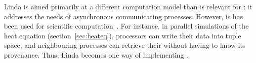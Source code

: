 Linda is aimed primarily at a different computation model than is
relevant for : it addresses the needs of
asynchronous communicating processes. However, is has been used for
scientific computation~\cite{Deshpande92efficientparallel}. For
instance, in parallel simulations of the heat equation
(section~\ref{sec:heateq}), processors can write their data into tuple
space, and neighbouring processes can retrieve their  without having to
know its provenance. Thus, Linda becomes one way of implementing
.


